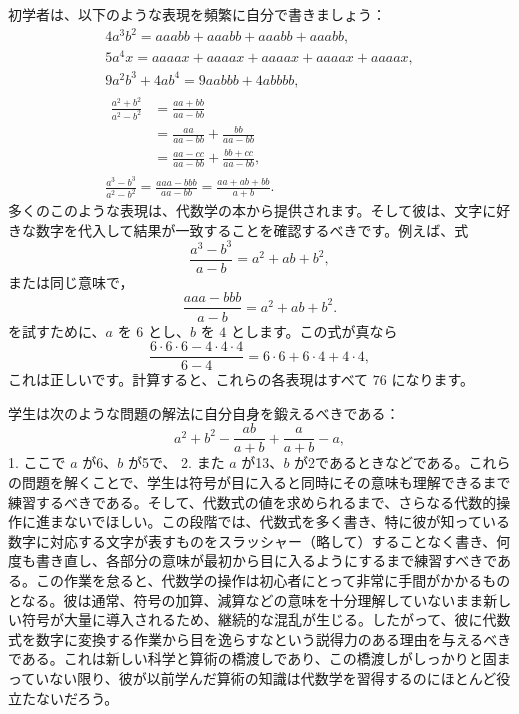 \documentclass[a4paper,11pt,openany]{ltjsbook}
\begin{document}
初学者は、以下のような表現を頻繁に自分で書きましょう：
\begin{gather*}
4a^{3} b^{2} = aaabb + aaabb + aaabb + aaabb, \\
5a^{4} x = aaaax + aaaax + aaaax + aaaax + aaaax, \\
9a^{2} b^{3} + 4ab^{4} = 9aabbb + 4abbbb, \\
\begin{aligned}
\frac{a^{2} + b^{2}}{a^{2} - b^{2}}
  &= \frac{aa + bb}{aa - bb} \\
  &= \frac{aa}{aa - bb} + \frac{bb}{aa - bb} \\
  &= \frac{aa - cc}{aa - bb} + \frac{bb + cc}{aa - bb},
\end{aligned} \\
\frac{a^{3} - b^{3}}{a^{2} - b^{2}}
  = \frac{aaa - bbb}{aa - bb}
  = \frac{aa + ab + bb}{a + b}.
\end{gather*}
多くのこのような表現は、代数学の本から提供されます。そして彼は、文字に好きな数字を代入して結果が一致することを確認するべきです。例えば、式
\[
\frac{a^{3} - b^{3}}{a - b} = a^{2} + ab + b^{2},
\]
または同じ意味で，
\[
\frac{aaa - bbb}{a - b} = a^{2} + ab + b^{2}.
\]
を試すために、$a$ を $6$ とし、$b$ を $4$ とします。この式が真なら
\[
\frac{6·6·6 - 4·4·4}{6 - 4} = 6·6 + 6·4 + 4·4,
\]
これは正しいです。計算すると、これらの各表現はすべて $76$ になります。

学生は次のような問題の解法に自分自身を鍛えるべきである：\[
a^{2} + b^{2} - \frac{ab}{a + b} + \frac{a}{a + b} - a,
\]
1. ここで $a$ が6、$b$ が5で、
2. また $a$ が13、$b$ が2であるときなどである。これらの問題を解くことで、学生は符号が目に入ると同時にその意味も理解できるまで練習するべきである。そして、代数式の値を求められるまで、さらなる代数的操作に進まないでほしい。この段階では、代数式を多く書き、特に彼が知っている数字に対応する文字が表すものをスラッシャー（略して）することなく書き、何度も書き直し、各部分の意味が最初から目に入るようにするまで練習すべきである。この作業を怠ると、代数学の操作は初心者にとって非常に手間がかかるものとなる。彼は通常、符号の加算、減算などの意味を十分理解していないまま新しい符号が大量に導入されるため、継続的な混乱が生じる。したがって、彼に代数式を数字に変換する作業から目を逸らすなという説得力のある理由を与えるべきである。これは新しい科学と算術の橋渡しであり、この橋渡しがしっかりと固まっていない限り、彼が以前学んだ算術の知識は代数学を習得するのにほとんど役立たないだろう。
\end{document}
